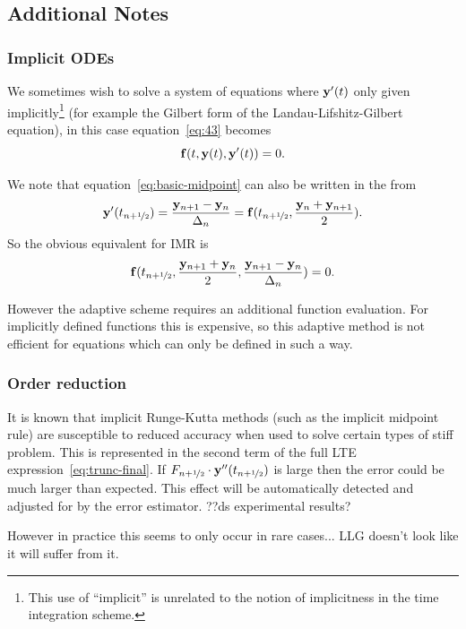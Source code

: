 \subsection{Additional Notes}

\subsubsection{Implicit ODEs}
\label{sec:extens-impl-odes}

We sometimes wish to solve a system of equations where $\yv'(t)$ only given implicitly\footnote{This use of ``implicit'' is unrelated to the notion of implicitness in the time integration scheme.} (for example the Gilbert form of the Landau-Lifshitz-Gilbert equation), in this case equation~\eqref{eq:43} becomes
\begin{equation}
  \fv(t, \yv(t), \yv'(t)) = 0.
\end{equation}

We note that equation~\eqref{eq:basic-midpoint} can also be written in the from
\begin{equation}
  \yv'(\thf) = \frac{\yv_{n+1} - \yv_n}{\dtn} =  \fv(\thf, \frac{\yv_n + \yv_{n+1}}{2}).
\end{equation}
So the obvious equivalent for IMR is
\begin{equation}
  \fv(\thf, \frac{\yv_{n+1} + \yv_n}{2}, \frac{\yv_{n+1} - \yv_n}{\dtn}) = 0.
\end{equation}

However the adaptive scheme requires an additional function evaluation.
For implicitly defined functions this is expensive, so this adaptive method is not efficient for equations which can only be defined in such a way.


\subsubsection{Order reduction}

It is known that implicit Runge-Kutta methods (such as the implicit midpoint rule) are susceptible to reduced accuracy when used to solve certain types of stiff problem.
This is represented in the second term of the full LTE expression~\eqref{eq:trunc-final}.
If $\dfdyhf \cdot \yvhf['']$ is large then the error could be much larger than expected.
This effect will be automatically detected and adjusted for by the error estimator. ??ds experimental results?

However in practice this seems to only occur in rare cases...
LLG doesn't look like it will suffer from it.



